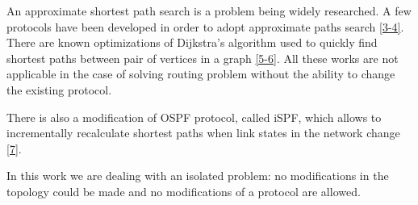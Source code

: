 An approximate shortest path search is a problem being widely researched. A few protocols have been developed in order to adopt approximate paths search \hyperref[ref:ring-zone]{[3-4]}. There are known optimizations of Dijkstra's algorithm used to quickly find shortest paths between pair of vertices in a graph \hyperref[ref:sp-us]{[5-6]}. All these works are not applicable in the case of solving routing problem without the ability to change the existing protocol.

There is also a modification of OSPF protocol, called iSPF, which allows to incrementally recalculate shortest paths when link states in the network change \hyperref[ref:ispf]{[7]}.

In this work we are dealing with an isolated problem: no modifications in the topology could be made and no modifications of a protocol are allowed.
